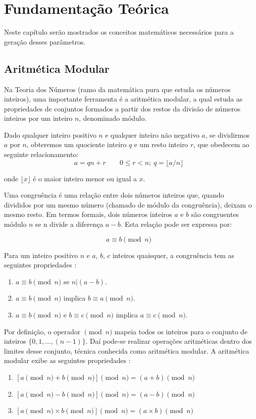 \chapter{Fundamentação Teórica}
Neste capítulo serão mostrados os conceitos matemáticos necessários para a geração desses parâmetros.

%
%
\section{Aritmética Modular}
Na Teoria dos Números \cite{Niven:2014} (ramo da matemática pura que estuda os números inteiros), uma importante ferramenta é a aritmética modular,  a qual estuda as propriedades de conjuntos formados a partir dos restos da divisão de números inteiros por um inteiro $n$, denominado módulo.

Dado qualquer inteiro positivo \(n\) e qualquer inteiro não negativo \(a\), se dividirmos \(a\) por \(n\), obteremos um quociente inteiro \(q\) e um resto inteiro \(r\), que obedecem ao seguinte relacionamento:
\begin{equation}
  a=qn+r \qquad 0 \leq r<n;\ q=\lfloor a/n \rfloor
\end{equation}

onde $\lfloor x \rfloor$ é o maior inteiro menor ou igual a \(x\).

Uma congruência é  uma relação entre dois números inteiros que, quando divididos por um mesmo número (chamado de módulo da congruência), deixam o mesmo resto.  Em termos formais, dois números inteiros \(a\) e \(b\) são congruentes módulo \(n\) se n divide a diferença \(a - b\).  Esta relação pode ser expressa por:

\begin{equation}
  a \equiv b \pmod n \label{eq:1}
\end{equation}

Para um inteiro positivo \(n\) e \(a\), \(b\), \(c\) inteiros quaisquer, a congruência tem as seguintes propriedades \cite{Stallings:2011}:
\begin{enumerate}
  \item $a \equiv b \pmod n$ se $n|(a-b)$.
  \item $a \equiv b \pmod n$ implica $b \equiv a \pmod n$.
  \item $a \equiv b \pmod n$ e $b \equiv c \pmod n$ implica $a \equiv c \pmod n$.
\end{enumerate}

Por definição, o operador $\pmod n$ mapeia todos os inteiros para o conjunto de inteiros $\{0, 1, ..., (n-1)\}$. Daí pode-se realizar operações aritméticas dentro dos limites desse conjunto, técnica conhecida como aritmética modular. A aritmética modular exibe as seguintes propriedades \cite{Stallings:2011}:
\begin{enumerate}
  \item $[a \pmod n + b \pmod n] \pmod n = (a + b) \pmod n$
  \item $[a \pmod n - b \pmod n] \pmod n = (a - b) \pmod n$
  \item $[a \pmod n \times b \pmod n] \pmod n = (a \times b) \pmod n$
\end{enumerate}

